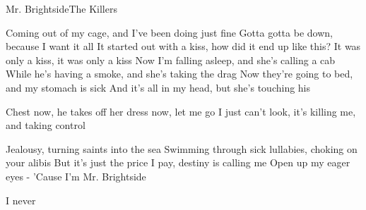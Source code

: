 \begin{song}{Mr. Brightside}{The Killers}{}

 

Coming out of my cage, and I've been doing just fine
Gotta gotta be down, because I want it all
It started out with a kiss, how did it end up like this?
It was only a kiss, it was only a kiss
Now I'm falling asleep, and she's calling a cab
While he's having a smoke, and she's taking the drag
Now they're going to bed, and my stomach is sick
And it's all in my head, but she's touching his

Chest now, he takes off her dress now, let me go
I just can't look, it's killing me, and taking control

Jealousy, turning saints into the sea
Swimming through sick lullabies, choking on your alibis
But it's just the price I pay, destiny is calling me
Open up my eager eyes  -  'Cause I'm Mr. Brightside






I never
\end{song}